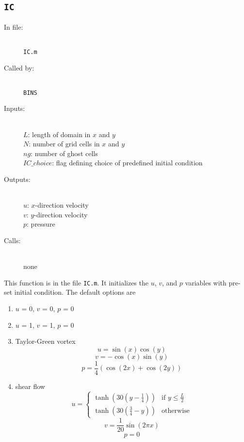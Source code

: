 \documentclass[12pt]{article}
\begin{document}
\subsection{\texttt{IC}}
\begin{description}
\item[In file:] \hfill \\ \texttt{IC.m}
\item[Called by:] \hfill \\ \texttt{BINS}
\item[Inputs:] \hfill \\ $L$: length of domain in $x$ and $y$ \\ $N$: number of grid cells in $x$ and $y$ \\ $ng$: number of ghost cells \\ $IC\_choice$: flag defining choice of predefined initial condition
\item[Outputs:] \hfill \\ $u$: $x$-direction velocity \\ $v$: $y$-direction velocity \\ $p$: pressure
\item[Calls:] \hfill \\ none
\end{description}
This function is in the file \texttt{IC.m}.  It initializes the $u$, $v$, and $p$ variables with pre-set initial condition.  The default options are
\begin{enumerate}
\item $u$ = 0, $v$ = 0, $p$ = 0
\item $u$ = 1, $v$ = 1, $p$ = 0
\item Taylor-Green vortex 
\[ u = \sin(x)\cos(y)\]
\[ v = -\cos(x)\sin(y)\]
\[ p = \frac{1}{4}\left( \cos(2x) + \cos(2y) \right)\]
\item shear flow
\[ u = \begin{cases} \tanh\left(30(y-\frac{1}{4})\right) & \text{if } y \le \frac{L}{2} \\ \tanh\left(30(\frac{3}{4}-y)\right) & \text{otherwise} \end{cases}\]
\[ v = \frac{1}{20}\sin(2\pi x)\]
\[ p = 0\]
\end{enumerate}
\end{document}
